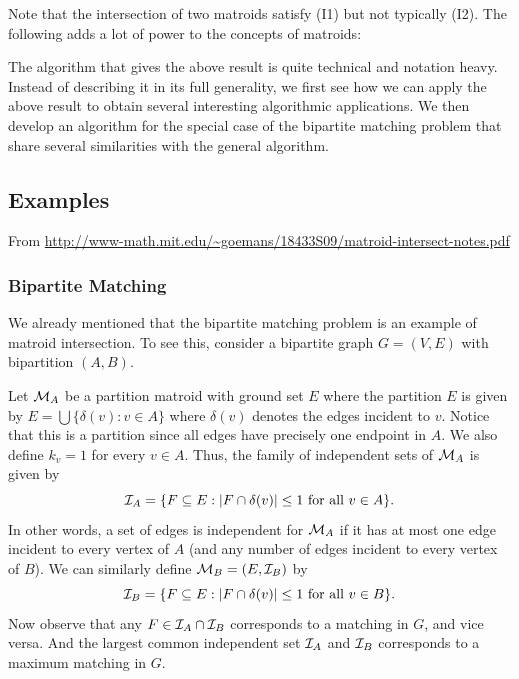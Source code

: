 
Note that the intersection of two matroids satisfy (I1) but not typically (I2). The following adds
a lot of power to the concepts of matroids:


The algorithm that gives the above result is quite technical and notation heavy. Instead of
describing it in its full generality, we first see how we can apply the above result to obtain
several interesting algorithmic applications. We then develop an algorithm for the special case of
the bipartite matching problem that share several similarities with the general algorithm.

\subsection{Examples}

From \url{http://www-math.mit.edu/~goemans/18433S09/matroid-intersect-notes.pdf}

\subsubsection{Bipartite Matching}

We already mentioned that the bipartite matching problem is an example of matroid intersection.
To see this, consider a bipartite graph $G=(V,E)$ with bipartition $(A,B)$.

Let $\mathcal{M}_A$ be a partition matroid with ground set $E$ where the partition $E$ is given by
$E=\bigcup\{\delta(v): v\in A\}$ where $\delta(v)$ denotes the edges incident to $v$. Notice that
this is a partition since all edges have precisely one endpoint in $A$. We also define $k_v=1$ for
every $v\in A$. Thus, the family of independent sets of $\mathcal{M}_A$ is given by
\[
  \mathcal{I}_A=\{F\subseteq E: |F\cap\delta(v)|\le 1 \text{ for all } v\in A\}.
\]
In other words, a set of edges is independent for $\mathcal{M}_A$ if it has at most one edge incident to
every vertex of $A$ (and any number of edges incident to every vertex of $B$). We can similarly
define $\mathcal{M}_B=(E,\mathcal{I}_B)$ by
\[
  \mathcal{I}_B=\{F\subseteq E: |F\cap\delta(v)|\le 1 \text{ for all } v\in B\}.
\]
Now observe that any $F\in\mathcal{I}_A\cap\mathcal{I}_B$ corresponds to a matching in $G$, and vice versa. And the
largest common independent set $\mathcal{I}_A$ and $\mathcal{I}_B$ corresponds to a maximum matching in $G$.

